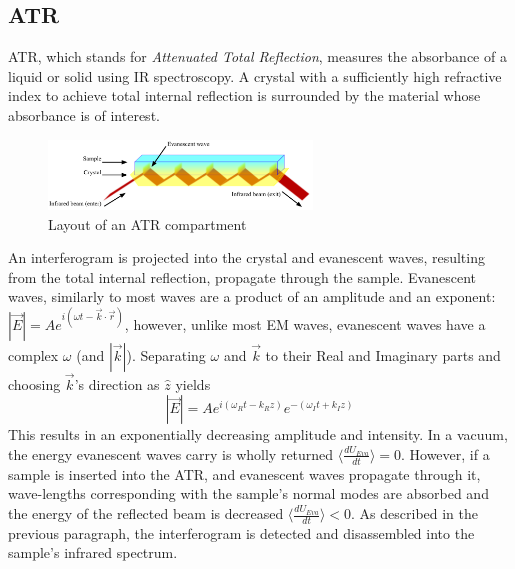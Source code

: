 \documentclass[reprint,amsmath,amssymb,aps, prl]{revtex4-2}
\begin{document}
\subsection{ATR}
ATR, which stands for \emph{Attenuated Total Reflection}, measures the absorbance of a liquid or solid using IR spectroscopy. A crystal with a sufficiently high refractive index to achieve total internal reflection is surrounded by the material whose absorbance is of interest. 
\begin{figure}[h]
    \includegraphics[width=7cm]{Images/ATR.png}
    \caption{Layout of an ATR compartment \cite{wiki:ATR}}
    \label{fig:ATR}
    \centering
\end{figure}
An interferogram is projected into the crystal and evanescent waves, resulting from the total internal reflection, propagate through the sample. 
Evanescent waves, similarly to most waves are a product of an amplitude and an exponent: $|\vec{E}|=Ae^{i(\omega t - \vec{k}\cdot\vec{r})}$, however, unlike most EM waves, evanescent waves have a complex $\omega$ (and $|\vec{k}|$). Separating $\omega$ and $\vec{k}$ to their Real and Imaginary parts and choosing $\vec{k}$'s direction as $\hat{z}$ yields
\begin{equation}
    |\vec{E}|=Ae^{i(\omega_R t - k_{R}z)}e^{-(\omega_I t + k_{I}z)}
\end{equation}
This results in an exponentially decreasing amplitude and intensity.
In a vacuum, the energy evanescent waves carry is wholly returned $\langle\frac{dU_{Eva}}{dt}\rangle=0$. However, if a sample is inserted into the ATR, and evanescent waves propagate through it, wave-lengths corresponding with the sample's normal modes are absorbed and the energy of the reflected beam is decreased $\langle\frac{dU_{Eva}}{dt}\rangle<0$. As described in the previous paragraph, the interferogram is detected and disassembled into the sample's infrared spectrum.
\end{document}
